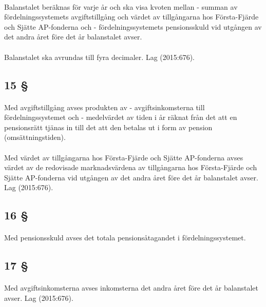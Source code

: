 \documentclass[a4paper,notitlepage,openany,10pt]{book}
\begin{document}
\paragraph*{}
Balanstalet beräknas för varje år och ska visa kvoten mellan
\newline - summan av fördelningssystemets avgiftstillgång och värdet av tillgångarna hos Första-Fjärde och Sjätte AP-fonderna och
\newline - fördelningssystemets pensionsskuld vid utgången av det andra året före det år balanstalet avser.
\paragraph*{}
Balanstalet ska avrundas till fyra decimaler.
Lag (2015:676).
\subsection*{15 §}
\paragraph*{}
Med avgiftstillgång avses produkten av
\newline - avgiftsinkomsterna till fördelningssystemet och
\newline - medelvärdet av tiden i år räknat från det att en pensionsrätt tjänas in till det att den betalas ut i form av pension (omsättningstiden).
\paragraph*{}
Med värdet av tillgångarna hos Första-Fjärde och Sjätte AP-fonderna avses värdet av de redovisade marknadsvärdena av tillgångarna hos Första-Fjärde och Sjätte AP-fonderna vid utgången av det andra året före det år balanstalet avser.
Lag (2015:676).
\subsection*{16 §}
\paragraph*{}
Med pensionsskuld avses det totala pensionsåtagandet i fördelningssystemet.
\subsection*{17 §}
\paragraph*{}
Med avgiftsinkomsterna avses inkomsterna det andra året före det år balanstalet avser.
Lag (2015:676).
\end{document}
